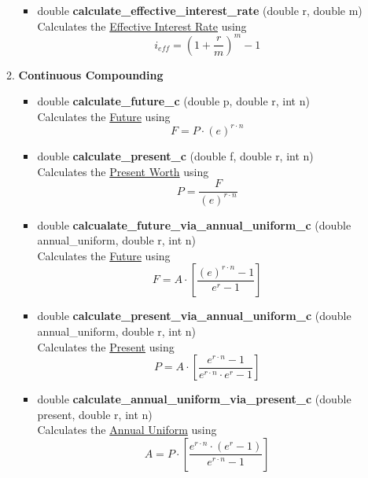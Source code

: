 \documentclass[english,12pt,a4paper,twoside,titlepage,leqno,fleqn]{article}
\begin{document}
\begin{enumerate}
\begin{enumerate}
\begin{itemize}
\item double {\bfseries calculate\_effective\_interest\_rate} \small{(double r, double m)}\\
Calculates the \underline{Effective Interest Rate} using\vspace{1cm} \[i_{eff}=(1+\frac{r}{m})^{m}-1\]\vspace{1cm}
\end{itemize}
\item {\bfseries Continuous Compounding}\vspace{1cm}
\begin{itemize}
	\item double {\bfseries calculate\_future\_c} \small{(double p, double r, int n)}\\
	Calculates the \underline{Future} using\vspace{1cm} \[F = P\cdot(e)^{r\cdot n}\]
	\vspace{1cm}
	\item double {\bfseries calculate\_present\_c} \small{(double f, double r, int n)}\\
	Calculates the \underline{Present Worth} using\vspace{1cm} \[P = \frac{F}{(e)^{r\cdot n}}\]
	\vspace{1cm}
	\item double {\bfseries calcualate\_future\_via\_annual\_uniform\_c} \small{(double annual\_uniform, double r, int n)}\\
	Calculates the \underline{Future} using\vspace{1cm} \[F = A\cdot\left[\frac{(e)^{r\cdot n}-1}{e^{r}-1}\right] \]\vspace{1cm}

	\item double {\bfseries calculate\_present\_via\_annual\_uniform\_c} \small{(double annual\_uniform, double r, int n)}\\
	Calculates the \underline{Present} using\vspace{1cm} \[P = A\cdot\left[\frac{e^{r\cdot n}-1}{e^{r\cdot n}\cdot e^{r}-1}\right]\]\vspace{1cm}

	\item double {\bfseries calculate\_annual\_uniform\_via\_present\_c} \small{(double present, double r, int n)}\\
	Calculates the \underline{Annual Uniform} using\vspace{1cm} \[A = P\cdot\left[\frac{ e^{r\cdot n}\cdot (e^{r}-1)}{e^{r\cdot n}-1}\right]\]\vspace{1cm}


\end{itemize}
\end{enumerate}
\end{enumerate}
\end{document}
